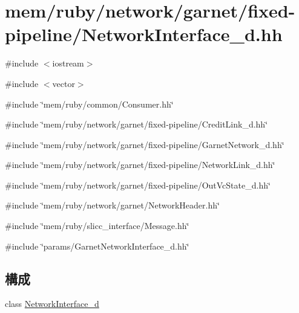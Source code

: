 \hypertarget{NetworkInterface__d_8hh}{
\section{mem/ruby/network/garnet/fixed-\/pipeline/NetworkInterface\_\-d.hh}
\label{NetworkInterface__d_8hh}
}
{\ttfamily \#include $<$iostream$>$}\par
{\ttfamily \#include $<$vector$>$}\par
{\ttfamily \#include \char`\"{}mem/ruby/common/Consumer.hh\char`\"{}}\par
{\ttfamily \#include \char`\"{}mem/ruby/network/garnet/fixed-\/pipeline/CreditLink\_\-d.hh\char`\"{}}\par
{\ttfamily \#include \char`\"{}mem/ruby/network/garnet/fixed-\/pipeline/GarnetNetwork\_\-d.hh\char`\"{}}\par
{\ttfamily \#include \char`\"{}mem/ruby/network/garnet/fixed-\/pipeline/NetworkLink\_\-d.hh\char`\"{}}\par
{\ttfamily \#include \char`\"{}mem/ruby/network/garnet/fixed-\/pipeline/OutVcState\_\-d.hh\char`\"{}}\par
{\ttfamily \#include \char`\"{}mem/ruby/network/garnet/NetworkHeader.hh\char`\"{}}\par
{\ttfamily \#include \char`\"{}mem/ruby/slicc\_\-interface/Message.hh\char`\"{}}\par
{\ttfamily \#include \char`\"{}params/GarnetNetworkInterface\_\-d.hh\char`\"{}}\par
\subsection*{構成}
\begin{DoxyCompactItemize}
\item 
class \hyperlink{classNetworkInterface__d}{NetworkInterface\_\-d}
\end{DoxyCompactItemize}
